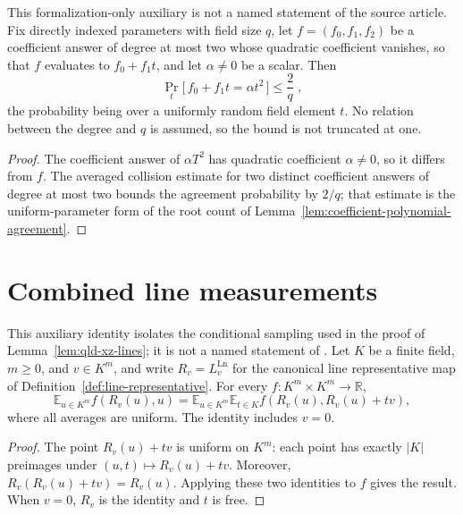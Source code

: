 \begin{lemma}
	\label{lem:linear-quadratic-agreement}
	\leanok
	This formalization-only auxiliary is not a named statement of the source
	article. Fix directly indexed parameters with field size $q$, let
	$f = (f_0, f_1, f_2)$ be a coefficient answer of degree at most two whose
	quadratic coefficient vanishes, so that $f$ evaluates to $f_0 + f_1 t$, and
	let $\alpha \neq 0$ be a scalar. Then
	\[
		\Pr_{t}\bigl[\,f_0 + f_1 t = \alpha t^2\,\bigr] \leq \frac{2}{q}\;,
	\]
	the probability being over a uniformly random field element $t$. No
	relation between the degree and $q$ is assumed, so the bound is not
	truncated at one.
\end{lemma}
\begin{proof}
	\leanok
	The coefficient answer of $\alpha T^2$ has quadratic coefficient
	$\alpha \neq 0$, so it differs from $f$. The averaged collision estimate for
	two distinct coefficient answers of degree at most two bounds the agreement
	probability by $2/q$; that estimate is the uniform-parameter form of the
	root count of Lemma~\ref{lem:coefficient-polynomial-agreement}.
\end{proof}

\section{Combined line measurements}

\begin{theorem}
	\label{thm:line-parameter-resampling}
	\leanok
	This auxiliary identity isolates the conditional sampling used in the
	proof of Lemma~\ref{lem:qld-xz-lines}; it is not a named statement of
	\cite{Ji2020MIPStar}. Let $K$ be a finite field, $m \geq 0$, and
	$v \in K^m$, and write $R_v = L^{\mathrm{Ln}}_v$ for the canonical line
	representative map of Definition~\ref{def:line-representative}.
	For every $f : K^m \times K^m \to \mathbb{R}$,
	\[
		\mathbb{E}_{u \in K^m} f(R_v(u),u)
		= \mathbb{E}_{u \in K^m}\mathbb{E}_{t \in K}
		f(R_v(u),R_v(u)+tv),
	\]
	where all averages are uniform. The identity includes $v=0$.
\end{theorem}
\begin{proof}
	\leanok
	The point $R_v(u)+tv$ is uniform on $K^m$: each point has exactly
	$|K|$ preimages under $(u,t) \mapsto R_v(u)+tv$. Moreover,
	$R_v(R_v(u)+tv)=R_v(u)$. Applying these two identities to $f$ gives
	the result. When $v=0$, $R_v$ is the identity and $t$ is free.
\end{proof}

